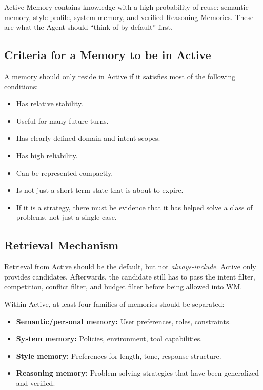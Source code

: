 \documentclass[a4paper,12pt]{article}
\begin{document}
Active Memory contains knowledge with a high probability of reuse: semantic memory, style profile, system memory, and verified Reasoning Memories. These are what the Agent should ``think of by default'' first.

\subsection*{Criteria for a Memory to be in Active}

A memory should only reside in Active if it satisfies most of the following conditions:
\begin{itemize}
    \item Has relative stability.
    \item Useful for many future turns.
    \item Has clearly defined domain and intent scopes.
    \item Has high reliability.
    \item Can be represented compactly.
    \item Is not just a short-term state that is about to expire.
    \item If it is a strategy, there must be evidence that it has helped solve a class of problems, not just a single case.
\end{itemize}

\subsection*{Retrieval Mechanism}

Retrieval from Active should be the default, but not \emph{always-include}. Active only provides candidates. Afterwards, the candidate still has to pass the intent filter, competition, conflict filter, and budget filter before being allowed into WM.

Within Active, at least four families of memories should be separated:
\begin{itemize}
    \item \textbf{Semantic/personal memory:} User preferences, roles, constraints.
    \item \textbf{System memory:} Policies, environment, tool capabilities.
    \item \textbf{Style memory:} Preferences for length, tone, response structure.
    \item \textbf{Reasoning memory:} Problem-solving strategies that have been generalized and verified.
\end{itemize}
\end{document}
